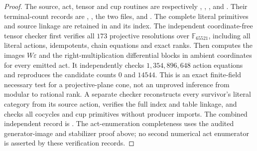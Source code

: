 \begin{proof}
The source, act, tensor and cup routines are respectively
,
,
, and
.
Their terminal-count records are
,
,
the two 
files, and .
The complete literal primitives and source linkage are retained in
 and its
 index.
The independent coordinate-free tensor checker
 first verifies all
$173$ projective resolutions over $\mathbb F_{65521}$, including
all literal actions, idempotents, chain equations and exact ranks.
Then  computes the images
$W\varepsilon$ and the right-multiplication differential blocks in
ambient coordinates for every emitted act.  It independently checks
$1{,}354{,}896{,}648$ action equations and reproduces the candidate
counts $0$ and $14544$.  This is an exact finite-field necessary test
for a projective-plane cone, not an unproved inference from modular
to rational rank.
A separate checker reconstructs every survivor's literal category
from its source action, verifies the full index and table linkage,
and checks all cocycles and cup primitives without producer imports.
The combined independent record is
.
The act-enumeration completeness uses the audited generator-image
and stabilizer proof above; no second numerical act enumerator is
asserted by these verification records.
\end{proof}

